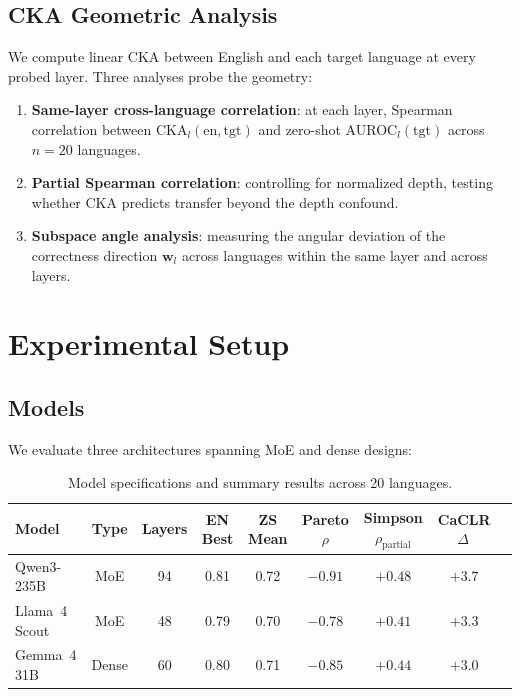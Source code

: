 \documentclass[11pt,a4paper]{article}
\newcommand{\pp}{\,\text{pp}}
\begin{document}
\subsection{CKA Geometric Analysis}
\label{sec:method:cka}

We compute linear CKA between English and each target language at every probed layer. Three analyses probe the geometry:
\begin{enumerate}
\item \textbf{Same-layer cross-language correlation}: at each layer, Spearman correlation between CKA$_l(\text{en}, \text{tgt})$ and zero-shot AUROC$_l(\text{tgt})$ across $n=20$ languages.
\item \textbf{Partial Spearman correlation}: controlling for normalized depth, testing whether CKA predicts transfer beyond the depth confound.
\item \textbf{Subspace angle analysis}: measuring the angular deviation of the correctness direction $\mathbf{w}_l$ across languages within the same layer and across layers.
\end{enumerate}

\section{Experimental Setup}
\label{sec:setup}

\subsection{Models}

We evaluate three architectures spanning MoE and dense designs:

\begin{table}[h]
\centering
\caption{Model specifications and summary results across 20 languages.}
\label{tab:three_arch}
\small
\begin{tabular}{lcccccccc}
\toprule
Model & Type & Layers & EN Best & ZS Mean & Pareto $\rho$ & Simpson $\rho_{\text{partial}}$ & CaCLR $\Delta$\pp \\
\midrule
Qwen3-235B & MoE & 94 & 0.81 & 0.72 & $-0.91$ & $+0.48$ & $+3.7$ \\
Llama~4 Scout & MoE & 48 & 0.79 & 0.70 & $-0.78$ & $+0.41$ & $+3.3$ \\
Gemma~4 31B & Dense & 60 & 0.80 & 0.71 & $-0.85$ & $+0.44$ & $+3.0$ \\
\bottomrule
\end{tabular}
\end{table}
\end{document}
